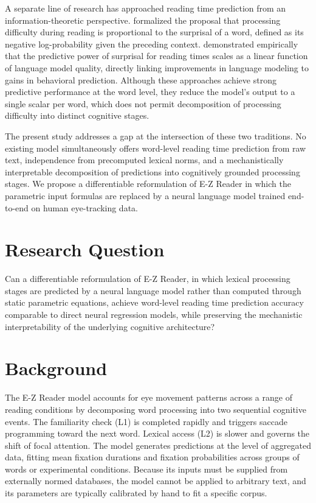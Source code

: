 \documentclass[12pt]{article}
\begin{document}
A separate line of research has approached reading time prediction from an
information-theoretic perspective. \citet{levy2008expectation} formalized the
proposal that processing difficulty during reading is proportional to the
surprisal of a word, defined as its negative log-probability given the
preceding context. \citet{goodkind2018predictive} demonstrated empirically
that the predictive power of surprisal for reading times scales as a linear
function of language model quality, directly linking improvements in language
modeling to gains in behavioral prediction. Although these approaches achieve
strong predictive performance at the word level, they reduce the model's output
to a single scalar per word, which does not permit decomposition of processing
difficulty into distinct cognitive stages.

The present study addresses a gap at the intersection of these two traditions.
No existing model simultaneously offers word-level reading time prediction from
raw text, independence from precomputed lexical norms, and a mechanistically
interpretable decomposition of predictions into cognitively grounded processing
stages. We propose a differentiable reformulation of E-Z Reader in which the
parametric input formulas are replaced by a neural language model trained
end-to-end on human eye-tracking data.

\section{Research Question}

Can a differentiable reformulation of E-Z Reader, in which lexical processing
stages are predicted by a neural language model rather than computed through
static parametric equations, achieve word-level reading time prediction
accuracy comparable to direct neural regression models, while preserving the
mechanistic interpretability of the underlying cognitive architecture?

\section{Background}

The E-Z Reader model \citep{reichle1998toward} accounts for eye movement
patterns across a range of reading conditions by decomposing word processing
into two sequential cognitive events. The familiarity check (L1) is completed
rapidly and triggers saccade programming toward the next word. Lexical access
(L2) is slower and governs the shift of focal attention. The model generates
predictions at the level of aggregated data, fitting mean fixation durations
and fixation probabilities across groups of words or experimental conditions.
Because its inputs must be supplied from externally normed databases, the model
cannot be applied to arbitrary text, and its parameters are typically
calibrated by hand to fit a specific corpus.
\end{document}

